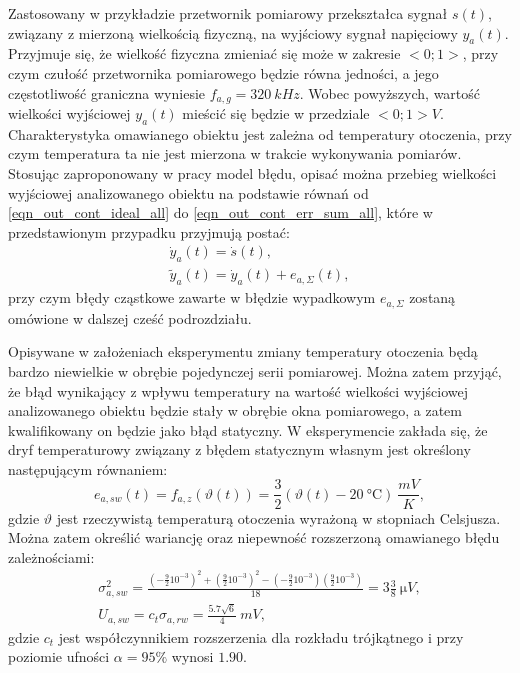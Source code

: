 Zastosowany w przykładzie przetwornik pomiarowy przekształca sygnał $s(t)$, związany z mierzoną wielkością fizyczną, na wyjściowy sygnał napięciowy $y_{a}(t)$. Przyjmuje się, że wielkość fizyczna zmieniać się może w zakresie $<0;1>$, przy czym czułość przetwornika pomiarowego będzie równa jedności, a jego częstotliwość graniczna wyniesie $f_{a,g} = \qty{320}{kHz}$. Wobec powyższych, wartość wielkości wyjściowej $y_{a}(t)$ mieścić się będzie w przedziale $<0;1>\unit{V}$. Charakterystyka omawianego obiektu jest zależna od temperatury otoczenia, przy czym temperatura ta nie jest mierzona w trakcie wykonywania pomiarów. Stosując zaproponowany w pracy model błędu, opisać można przebieg wielkości wyjściowej analizowanego obiektu na podstawie równań od \eqref{eqn_out_cont_ideal_all} do \eqref{eqn_out_cont_err_sum_all}, które w przedstawionym przypadku przyjmują postać:
\begin{gather}
\dot{y}_{a}(t) = \dot{s}(t) \label{eqn_sym_parta_out_ideal}, \\
\tilde{y}_{a}(t) = \dot{y}_{a}(t) + e_{a,\Sigma}(t) \label{eqn_sym_parta_out_real},
\end{gather}
przy czym błędy cząstkowe zawarte w błędzie wypadkowym $e_{a,\Sigma}$ zostaną omówione w dalszej cześć podrozdziału.

Opisywane w założeniach eksperymentu zmiany temperatury otoczenia będą bardzo niewielkie w obrębie pojedynczej serii pomiarowej. Można zatem przyjąć, że błąd wynikający z wpływu temperatury na wartość wielkości wyjściowej analizowanego obiektu będzie stały w obrębie okna pomiarowego, a zatem kwalifikowany on będzie jako błąd statyczny. W eksperymencie zakłada się, że dryf temperaturowy związany z błędem statycznym własnym jest określony następującym równaniem:
\begin{equation}
e_{a,sw}(t) = f_{a,z}(\vartheta(t)) = \frac{3}{2} (\vartheta(t) - \qty{20}{\degreeCelsius}) ~\unit{\frac{mV}{K}} \label{eqn_sym_parta_stat_err},
\end{equation}
gdzie $\vartheta$ jest rzeczywistą temperaturą otoczenia wyrażoną w stopniach Celsjusza. Można zatem określić wariancję oraz niepewność rozszerzoną omawianego błędu zależnościami:
\begin{gather}
\sigma_{a,sw}^{2} = \frac{\left( -\frac{9}{2} 10^{-3} \right)^{2} + \left( \frac{9}{2} 10^{-3} \right)^{2} - \left( -\frac{9}{2} 10^{-3} \right) \left( \frac{9}{2} 10^{-3} \right)}{18} = 3 \frac{3}{8} ~\unit{\micro V} \label{eqn_sym_parta_stat_var}, \\
U_{a,sw} = c_{t} \sigma_{a,rw} = \frac{5.7 \sqrt{6}}{4} ~\unit{mV} \label{eqn_sym_parta_stat_unc},
\end{gather}
gdzie $c_{t}$ jest współczynnikiem rozszerzenia dla rozkładu trójkątnego i przy poziomie ufności $\alpha = 95\%$ wynosi $1.90$.

